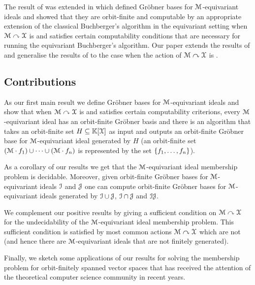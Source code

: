%
The result of \cite{HISU12} was extended in \cite{BRDR11} which defined Gr\"{o}bner bases for $\mathcal{M}$-equivariant ideals and showed that they are orbit-finite and computable by an appropriate extension of the classical Buchberger's 
algorithm in the equivariant setting when $\mathcal{M}\curvearrowright\mathcal{X}$ is  and satisfies certain computability conditions that are necessary for running the equivariant Buchberger's algorithm.
Our paper extends the results of \cite{GHOLAS24,LauSno26} and generalise the results of \cite{BRDR11} to the case when the action of $\mathcal{M}\curvearrowright\mathcal{X}$ is .
%
\subsection{Contributions}

As our first main result we define Gr\"{o}bner bases for $\mathcal{M}$-equivariant ideals and show that when $\mathcal{M}\curvearrowright\mathcal{X}$ is  and satisfies certain computability criterions,
every $\mathcal{M}$-equivariant ideal has an orbit-finite Gr\"{o}bner basis and
there is an algorithm that takes an orbit-finite set $H\subseteq\mathbb{K}[\mathcal{X}]$ as input and outputs an orbit-finite Gr\"{o}bner base for $\mathcal{M}$-equivariant ideal generated by $H$ (an orbit-finite set
$(\mathcal{M}\cdot f_1)\cup\dots\cup(\mathcal{M}\cdot f_n)$ is represented by the set $\{ f_1,\dots,f_n \}$).

As a corollary of our results we get that the $\mathcal{M}$-equivariant ideal membership problem is decidable.
Moreover, given orbit-finite Gr\"{o}bner bases for $\mathcal{M}$-equivariant ideals $\idl[I]$ and $\idl[J]$ one can compute orbit-finite Gr\"{o}bner bases for $\mathcal{M}$-equivariant ideals generated by $\idl[I]\cup\idl[J]$, $\idl[I]\cap\idl[J]$ and $\idl[I]\idl[J]$.

We complement our positive results by giving a sufficient condition on $\mathcal{M}\curvearrowright\mathcal{X}$ for the undecidability of the $\mathcal{M}$-equivariant ideal membership problem.
This sufficient condition is satisfied by most common actions $\mathcal{M}\curvearrowright\mathcal{X}$ which are not  (and hence there are $\mathcal{M}$-equivariant ideals that are not finitely generated). 

Finally, we sketch some applications of our results for solving the membership problem for orbit-finitely spanned vector spaces that has received the attention of the theoretical computer science community in recent years.
%
